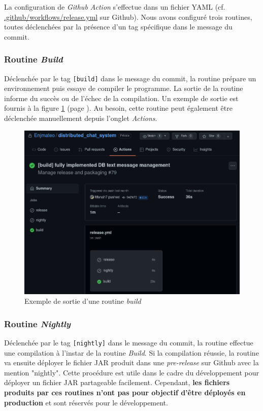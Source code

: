 \documentclass[12pt, a4paper]{article}
\begin{document}
    La configuration de \textit{Github Action} s'effectue dans un fichier YAML (cf. \url{.github/workflows/release.yml} sur Github). Nous avons configuré trois routines, toutes déclenchées par la présence d'un tag spécifique dans le message du commit.
    
    \subsubsection{Routine \textit{Build}}
    Déclenchée par le tag \texttt{[build]} dans le message du commit, la routine prépare un environnement puis essaye de compiler le programme. La sortie de la routine informe du succès ou de l'échec de la compilation. Un exemple de sortie est fournis à la figure \ref{build_img} (page \pageref{build_img}). Au besoin, cette routine peut également être déclenchée manuellement depuis l'onglet \textit{Actions}.
    
    \begin{figure}[!ht]
        \centering
        \includegraphics[width=\textwidth]{img/trigg_build.png}
        \caption{Exemple de sortie d'une routine \textit{build}}
        \label{build_img}
    \end{figure}
    
    \subsubsection{Routine \textit{Nightly}}
    Déclenchée par le tag \texttt{[nightly]} dans le message du commit, la routine effectue une compilation à l'instar de la routine \textit{Build}. Si la compilation réussie, la routine va ensuite déployer le fichier JAR produit dans une \textit{pre-release} sur Github avec la mention "nightly". Cette procédure est utile dans le cadre du développement pour déployer un fichier JAR partageable facilement. Cependant, \textbf{les fichiers produits par ces routines n'ont pas pour objectif d'être déployés en production} et sont réservés pour le développement.
    
\end{document}
